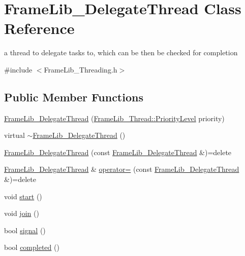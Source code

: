 \hypertarget{class_frame_lib___delegate_thread}{}\section{Frame\+Lib\+\_\+\+Delegate\+Thread Class Reference}
\label{class_frame_lib___delegate_thread}


a thread to delegate tasks to, which can be then be checked for completion  




{\ttfamily \#include $<$Frame\+Lib\+\_\+\+Threading.\+h$>$}

\subsection*{Public Member Functions}
\begin{DoxyCompactItemize}
\item 
\hyperlink{class_frame_lib___delegate_thread_a0b56650235d213cb94df48dadd5ac657}{Frame\+Lib\+\_\+\+Delegate\+Thread} (\hyperlink{class_frame_lib___thread_a99a5e56edcadf37e3388f5557e8ec7ed}{Frame\+Lib\+\_\+\+Thread\+::\+Priority\+Level} priority)
\item 
virtual \hyperlink{class_frame_lib___delegate_thread_a85bf48f07bb1a0f666be8c3ca7119c26}{$\sim$\+Frame\+Lib\+\_\+\+Delegate\+Thread} ()
\item 
\hyperlink{class_frame_lib___delegate_thread_a9a150c0742bd28d06e0e6fad698ee0c9}{Frame\+Lib\+\_\+\+Delegate\+Thread} (const \hyperlink{class_frame_lib___delegate_thread}{Frame\+Lib\+\_\+\+Delegate\+Thread} \&)=delete
\item 
\hyperlink{class_frame_lib___delegate_thread}{Frame\+Lib\+\_\+\+Delegate\+Thread} \& \hyperlink{class_frame_lib___delegate_thread_a13be49ee178426e0380c88e9e5544013}{operator=} (const \hyperlink{class_frame_lib___delegate_thread}{Frame\+Lib\+\_\+\+Delegate\+Thread} \&)=delete
\item 
void \hyperlink{class_frame_lib___delegate_thread_af954e98c441430f66868b83ea3cf9f01}{start} ()
\item 
void \hyperlink{class_frame_lib___delegate_thread_ab46bdfbd5a37ef8652440684ff38db6b}{join} ()
\item 
bool \hyperlink{class_frame_lib___delegate_thread_afe1365fd2b19f435da23a2b14374bd29}{signal} ()
\item 
bool \hyperlink{class_frame_lib___delegate_thread_a621fe74509d9a92a0ef7f8a93b26de6e}{completed} ()
\end{DoxyCompactItemize}


